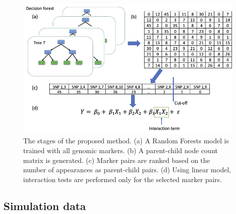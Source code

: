 \documentclass[authoryear,preprint,12pt,3p]{elsarticle}
\begin{document}
\begin{figure}[thbp]
  \begin{center}
    \centering
    \includegraphics[totalheight=5cm]{./figs/Figure_1.png}
    \caption{The stages of the proposed method. (a) A Random Forests model is trained with all genomic markers. (b) A
      parent-child node count matrix is generated. (c) Marker pairs are ranked based on the number of appearances as
      parent-child pairs. (d) Using linear model, interaction tests are performed only for the selected marker pairs. }
    \label{figure:RF_Method} 
  \end{center}
\end{figure}

\subsection{Simulation data}
\end{document}
